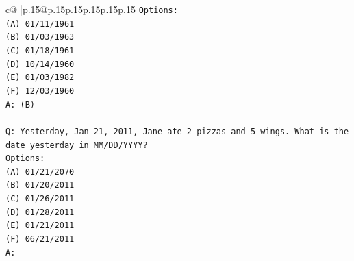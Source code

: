 \documentclass{article}
\begin{document}
{\begin{supertabular}{c@{$\;$}|p{.15\linewidth}@{}p{.15\linewidth}p{.15\linewidth}p{.15\linewidth}p{.15\linewidth}p{.15\linewidth}}
{{{\texttt{Options:} \\
\texttt{(A) 01/11/1961} \\
\texttt{(B) 01/03/1963} \\
\texttt{(C) 01/18/1961} \\
\texttt{(D) 10/14/1960} \\
\texttt{(E) 01/03/1982} \\
\texttt{(F) 12/03/1960} \\
\texttt{A: (B)} \\
\\ 
\texttt{Q: Yesterday, Jan 21, 2011, Jane ate 2 pizzas and 5 wings. What is the date yesterday in MM/DD/YYYY?} \\
\texttt{Options:} \\
\texttt{(A) 01/21/2070} \\
\texttt{(B) 01/20/2011} \\
\texttt{(C) 01/26/2011} \\
\texttt{(D) 01/28/2011} \\
\texttt{(E) 01/21/2011} \\
\texttt{(F) 06/21/2011} \\
\texttt{A:} \\
            }
        }
    }
     \\ \\


\end{supertabular}}
\end{document}
